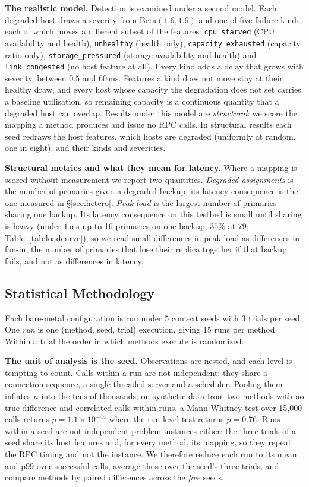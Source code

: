 \documentclass[journal]{IEEEtran}
\begin{document}
\textbf{The realistic model.} Detection is examined under a second model. Each
degraded host draws a severity from $\mathrm{Beta}(1.6, 1.6)$ and one of five
failure kinds, each of which moves a different subset of the features:
\texttt{cpu\_starved} (CPU availability and health), \texttt{unhealthy} (health
only), \texttt{capacity\_exhausted} (capacity ratio only),
\texttt{storage\_pressured} (storage availability and health) and
\texttt{link\_congested} (no host feature at all). Every kind adds a delay that
grows with severity, between $0.5$ and $60$\,ms. Features a kind does not move
stay at their healthy draw, and every host whose capacity the degradation does
not set carries a baseline utilisation, so remaining capacity is a continuous
quantity that a degraded host can overlap. Results under this model are
\emph{structural}: we score the mapping a method produces and issue no RPC
calls. In structural results each seed redraws the host features, which hosts
are degraded (uniformly at random, one in eight), and their kinds and
severities.

\textbf{Structural metrics and what they mean for latency.} Where a mapping is
scored without measurement we report two quantities. \emph{Degraded
assignments} is the number of primaries given a degraded backup; its latency
consequence is the one measured in \S\ref{sec:hetero}. \emph{Peak load} is the
largest number of primaries sharing one backup. Its latency consequence on this
testbed is small until sharing is heavy (under $1$\,ms up to 16 primaries on one
backup, $35\%$ at 79; Table~\ref{tab:loadcurve}), so we read small differences
in peak load as differences in fan-in, the number of primaries that lose their
replica together if that backup fails, and not as differences in latency.

\subsection{Statistical Methodology}
\label{sec:stats}

Each bare-metal configuration is run under 5 context seeds with 3 trials per
seed. One \emph{run} is one (method, seed, trial) execution, giving 15 runs per
method. Within a trial the order in which methods execute is randomized.

\textbf{The unit of analysis is the seed.} Observations are nested, and each
level is tempting to count. Calls within a run are not independent: they share a
connection sequence, a single-threaded server and a scheduler. Pooling them
inflates $n$ into the tens of thousands; on synthetic data from two methods with
no true difference and correlated calls within runs, a Mann-Whitney test over
15{,}000 calls returns $p = 1.1\times10^{-44}$ where the run-level test returns
$p = 0.76$. Runs within a seed are not independent problem instances either: the
three trials of a seed share its host features and, for every method, its
mapping, so they repeat the RPC timing and not the instance. We therefore reduce
each run to its mean and p99 over successful calls, average those over the
seed's three trials, and compare methods by paired differences across the
\emph{five} seeds.
\end{document}
